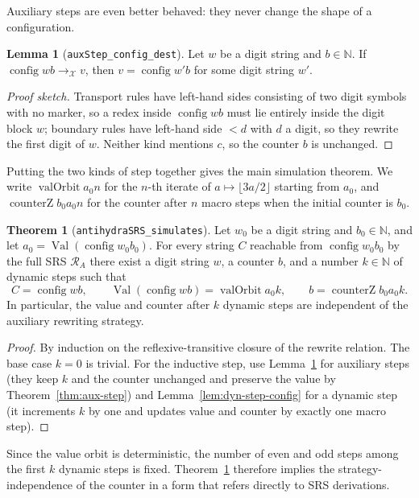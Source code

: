 \documentclass[11pt,a4paper]{article}
\theoremstyle{definition}
\newtheorem{lemma}[definition]{Lemma}
\newtheorem{theorem}[definition]{Theorem}
\newcommand{\lt}{<}
\newcommand{\Nat}{\mathbb{N}}
\newcommand{\val}{\operatorname{Val}}
\newcommand{\config}{\operatorname{config}}
\newcommand{\auxRules}{\mathcal{X}}
\newcommand{\antihydraSRS}{\mathcal{R}_{A}}
\newcommand{\valOrbit}{\operatorname{valOrbit}}
\newcommand{\counterZ}{\operatorname{counterZ}}
\begin{document}
Auxiliary steps are even better behaved: they never change the shape of
a configuration.

\begin{lemma}[\texttt{auxStep\_config\_dest}]
\label{lem:aux-step-config}
Let $w$ be a digit string and $b\in\Nat$.  If
$\config w b\to_{\auxRules}v$, then $v=\config{w'}{b}$ for some digit
string $w'$.
\end{lemma}
\begin{proof}[Proof sketch]
Transport rules have left-hand sides consisting of two digit symbols
with no marker, so a redex inside $\config w b$ must lie entirely
inside the digit block $w$; boundary rules have left-hand side
$\lt d$ with $d$ a digit, so they rewrite the first digit of $w$.
Neither kind mentions $c$, so the counter $b$ is unchanged.
\end{proof}

Putting the two kinds of step together gives the main simulation theorem.
We write $\valOrbit{a_0}{n}$ for the $n$-th iterate of
$a\mapsto\lfloor3a/2\rfloor$ starting from $a_0$, and
$\counterZ{b_0}{a_0}{n}$ for the counter after $n$ macro steps when the
initial counter is $b_0$.

\begin{theorem}[\texttt{antihydraSRS\_simulates}]
\label{thm:faithful-simulation}
Let $w_0$ be a digit string and $b_0\in\Nat$, and let $a_0=\val(\config{w_0}{b_0})$.
For every string $C$ reachable from $\config{w_0}{b_0}$ by the full SRS
$\antihydraSRS$ there exist a digit string $w$, a counter $b$, and a
number $k\in\Nat$ of dynamic steps such that
\[
  C=\config w b,\qquad
  \val(\config w b)=\valOrbit{a_0}{k},\qquad
  b=\counterZ{b_0}{a_0}{k}.
\]
In particular, the value and counter after $k$ dynamic steps are
independent of the auxiliary rewriting strategy.
\end{theorem}
\begin{proof}
By induction on the reflexive-transitive closure of the rewrite
relation.  The base case $k=0$ is trivial.  For the inductive step,
use Lemma~\ref{lem:aux-step-config} for auxiliary steps (they keep $k$
and the counter unchanged and preserve the value by
Theorem~\ref{thm:aux-step}) and Lemma~\ref{lem:dyn-step-config} for a
dynamic step (it increments $k$ by one and updates value and counter by
exactly one macro step).
\end{proof}

Since the value orbit is deterministic, the number of even and odd
steps among the first $k$ dynamic steps is fixed.  Theorem~\ref{thm:faithful-simulation}
therefore implies the strategy-independence of the counter in a form
that refers directly to SRS derivations.
\end{document}
